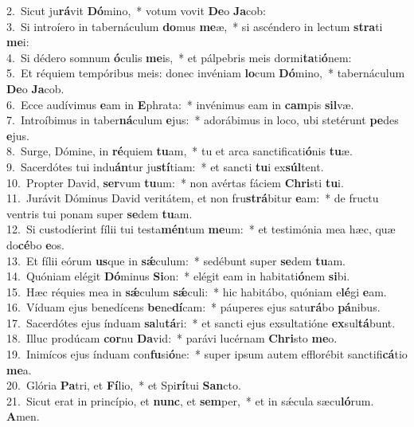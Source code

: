 {2.~}Sicut ju\textbf{rá}vit \textbf{Dó}mino,~* votum vovit \textbf{De}o \textbf{Ja}cob:\\
{3.~}Si introíero in tabernáculum \textbf{do}mus \textbf{me}æ,~* si ascéndero in lectum \textbf{stra}ti \textbf{me}i:\\
{4.~}Si dédero somnum \textbf{ó}culis \textbf{me}is,~* et pálpebris meis dormi\textbf{ta}ti\textbf{ó}nem:\\
{5.~}Et réquiem tempóribus meis: donec invéniam \textbf{lo}cum \textbf{Dó}mino,~* tabernáculum \textbf{De}o \textbf{Ja}cob.\\
{6.~}Ecce audívimus \textbf{e}am in \textbf{E}phrata:~* invénimus eam in \textbf{cam}pis \textbf{sil}væ.\\
{7.~}Introíbimus in taber\textbf{ná}culum \textbf{e}jus:~* adorábimus in loco, ubi stetérunt \textbf{pe}des \textbf{e}jus.\\
{8.~}Surge, Dómine, in \textbf{ré}quiem \textbf{tu}am,~* tu et arca sanctificati\textbf{ó}nis \textbf{tu}æ.\\
{9.~}Sacerdótes tui indu\textbf{án}tur ju\textbf{stí}tiam:~* et sancti \textbf{tu}i ex\textbf{súl}tent.\\
{10.~}Propter David, \textbf{ser}vum \textbf{tu}um:~* non avértas fáciem \textbf{Chri}sti \textbf{tu}i.\\
{11.~}Jurávit Dóminus David veritátem, et non fru\textbf{strá}bitur \textbf{e}am:~* de fructu ventris tui ponam super \textbf{se}dem \textbf{tu}am.\\
{12.~}Si custodíerint fílii tui testa\textbf{mén}tum \textbf{me}um:~* et testimónia mea hæc, quæ do\textbf{cé}bo \textbf{e}os.\\
{13.~}Et fílii eórum \textbf{us}que in \textbf{sǽ}culum:~* sedébunt super \textbf{se}dem \textbf{tu}am.\\
{14.~}Quóniam elégit \textbf{Dó}minus \textbf{Si}on:~* elégit eam in habitati\textbf{ó}nem \textbf{si}bi.\\
{15.~}Hæc réquies mea in \textbf{sǽ}culum \textbf{sǽ}culi:~* hic habitábo, quóniam e\textbf{lé}gi \textbf{e}am.\\
{16.~}Víduam ejus benedícens \textbf{be}ne\textbf{dí}cam:~* páuperes ejus satu\textbf{rá}bo \textbf{pá}nibus.\\
{17.~}Sacerdótes ejus índuam \textbf{sa}lu\textbf{tá}ri:~* et sancti ejus exsultatióne \textbf{ex}sul\textbf{tá}bunt.\\
{18.~}Illuc prodúcam \textbf{cor}nu \textbf{Da}vid:~* parávi lucérnam \textbf{Chri}sto \textbf{me}o.\\
{19.~}Inimícos ejus índuam con\textbf{fu}si\textbf{ó}ne:~* super ipsum autem efflorébit sanctifi\textbf{cá}tio \textbf{me}a.\\
{20.~}Glória \textbf{Pa}tri, et \textbf{Fí}lio,~* et Spi\textbf{rí}tui \textbf{San}cto.\\
{21.~}Sicut erat in princípio, et \textbf{nunc}, et \textbf{sem}per,~* et in sǽcula sæcu\textbf{ló}rum. \textbf{A}men.\\
